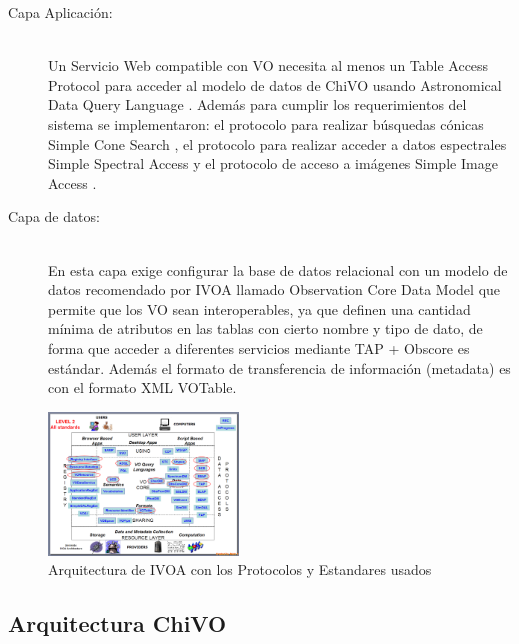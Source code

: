 \begin{description}
    \item[Capa Aplicación:] \hfill \\
        Un Servicio Web compatible con VO necesita al menos un Table Access Protocol
        \cite{dowler2010table} para acceder al modelo de datos de ChiVO usando Astronomical
        Data Query Language \cite{yasuda2004astronomical}. Además para cumplir los requerimientos del
        sistema se implementaron: el protocolo para realizar búsquedas cónicas
        Simple Cone Search \cite{williams2008simple}, el protocolo para realizar acceder a datos
        espectrales Simple Spectral Access \cite{tody2008simple} y el protocolo de acceso a
        imágenes Simple Image Access \cite{tody2004simple}.

    \item[Capa de datos:] \hfill \\
        En esta capa exige configurar la base de datos relacional con un modelo de
        datos recomendado por IVOA llamado Observation Core Data Model \cite{louys2011ivoa}
        que permite que los VO sean interoperables, ya que definen una cantidad
        mínima de atributos en las tablas con cierto nombre y tipo de dato, de forma
        que acceder a diferentes servicios mediante TAP + Obscore es estándar.
        Además el formato de transferencia de información (metadata) es con el
        formato XML VOTable.
\end{description}

\begin{figure}[h]
    \centering
    \includegraphics[width=0.45\textwidth]{images/arquitectura_2.png}
    \caption{Arquitectura de IVOA con los Protocolos y Estandares usados}
    \label{fig:ivoarch}
\end{figure}

\subsection{Arquitectura ChiVO}

